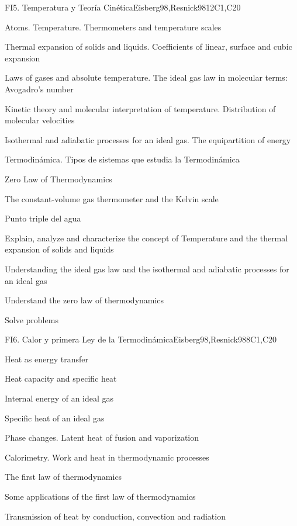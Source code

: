 \begin{syllabus}
\begin{unit}{FI5. Temperatura y Teoría Cinética}{}{Eisberg98,Resnick98}{12}{C1,C20}
\begin{topics}
         \item  Atoms. Temperature. Thermometers and temperature scales
	 \item  Thermal expansion of solids and liquids. Coefficients of linear, surface and cubic expansion
         \item  Laws of gases and absolute temperature. The ideal gas law in molecular terms: Avogadro's number
	 \item  Kinetic theory and molecular interpretation of temperature. Distribution of molecular velocities
         \item  Isothermal and adiabatic processes for an ideal gas. The equipartition of energy
	 \item  Termodinámica. Tipos de sistemas que estudia la Termodinámica
         \item  Zero Law of Thermodynamics
	 \item  The constant-volume gas thermometer and the Kelvin scale
         \item  Punto triple del agua
   \end{topics}

   \begin{learningoutcomes}
         \item  Explain, analyze and characterize the concept of Temperature and the thermal expansion of solids and liquids
         \item  Understanding the ideal gas law and the isothermal and adiabatic processes for an ideal gas
         \item  Understand the zero law of thermodynamics
         \item  Solve problems
   \end{learningoutcomes}
\end{unit}

\begin{unit}{FI6. Calor y primera Ley de la Termodinámica}{}{Eisberg98,Resnick98}{8}{C1,C20}
\begin{topics}
         \item  Heat as energy transfer
	 \item  Heat capacity and specific heat
         \item  Internal energy of an ideal gas
	 \item  Specific heat of an ideal gas
         \item  Phase changes. Latent heat of fusion and vaporization
	 \item  Calorimetry. Work and heat in thermodynamic processes
         \item  The first law of thermodynamics
	 \item  Some applications of the first law of thermodynamics
         \item  Transmission of heat by conduction, convection and radiation
   \end{topics}


\end{unit}
\end{syllabus}
